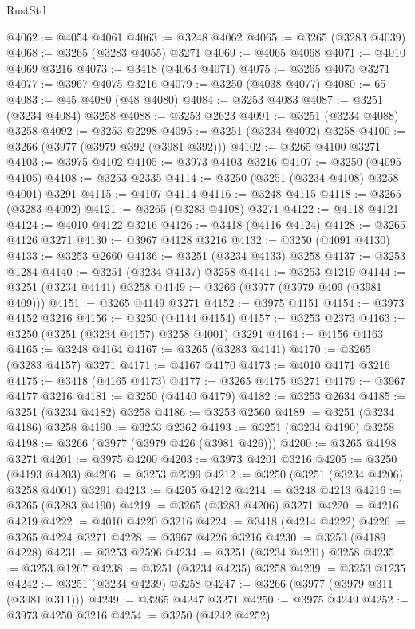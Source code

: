 \begin{lexlean}{RustStd}
\begin{coremodule}
@4062 := @4054 @4061
@4063 := @3248 @4062
@4065 := @3265 (@3283 @4039)
@4068 := @3265 (@3283 @4055) @3271
@4069 := @4065 @4068
@4071 := @4010 @4069 @3216
@4073 := @3418 (@4063 @4071)
@4075 := @3265 @4073 @3271
@4077 := @3967 @4075 @3216
@4079 := @3250 (@4038 @4077)
@4080 := 65
@4083 := @45 @4080 (@48 @4080)
@4084 := @3253 @4083
@4087 := @3251 (@3234 @4084) @3258
@4088 := @3253 @2623
@4091 := @3251 (@3234 @4088) @3258
@4092 := @3253 @2298
@4095 := @3251 (@3234 @4092) @3258
@4100 := @3266 (@3977 (@3979 @392 (@3981 @392)))
@4102 := @3265 @4100 @3271
@4103 := @3975 @4102
@4105 := @3973 @4103 @3216
@4107 := @3250 (@4095 @4105)
@4108 := @3253 @2335
@4114 := @3250 (@3251 (@3234 @4108) @3258 @4001) @3291
@4115 := @4107 @4114
@4116 := @3248 @4115
@4118 := @3265 (@3283 @4092)
@4121 := @3265 (@3283 @4108) @3271
@4122 := @4118 @4121
@4124 := @4010 @4122 @3216
@4126 := @3418 (@4116 @4124)
@4128 := @3265 @4126 @3271
@4130 := @3967 @4128 @3216
@4132 := @3250 (@4091 @4130)
@4133 := @3253 @2660
@4136 := @3251 (@3234 @4133) @3258
@4137 := @3253 @1284
@4140 := @3251 (@3234 @4137) @3258
@4141 := @3253 @1219
@4144 := @3251 (@3234 @4141) @3258
@4149 := @3266 (@3977 (@3979 @409 (@3981 @409)))
@4151 := @3265 @4149 @3271
@4152 := @3975 @4151
@4154 := @3973 @4152 @3216
@4156 := @3250 (@4144 @4154)
@4157 := @3253 @2373
@4163 := @3250 (@3251 (@3234 @4157) @3258 @4001) @3291
@4164 := @4156 @4163
@4165 := @3248 @4164
@4167 := @3265 (@3283 @4141)
@4170 := @3265 (@3283 @4157) @3271
@4171 := @4167 @4170
@4173 := @4010 @4171 @3216
@4175 := @3418 (@4165 @4173)
@4177 := @3265 @4175 @3271
@4179 := @3967 @4177 @3216
@4181 := @3250 (@4140 @4179)
@4182 := @3253 @2634
@4185 := @3251 (@3234 @4182) @3258
@4186 := @3253 @2560
@4189 := @3251 (@3234 @4186) @3258
@4190 := @3253 @2362
@4193 := @3251 (@3234 @4190) @3258
@4198 := @3266 (@3977 (@3979 @426 (@3981 @426)))
@4200 := @3265 @4198 @3271
@4201 := @3975 @4200
@4203 := @3973 @4201 @3216
@4205 := @3250 (@4193 @4203)
@4206 := @3253 @2399
@4212 := @3250 (@3251 (@3234 @4206) @3258 @4001) @3291
@4213 := @4205 @4212
@4214 := @3248 @4213
@4216 := @3265 (@3283 @4190)
@4219 := @3265 (@3283 @4206) @3271
@4220 := @4216 @4219
@4222 := @4010 @4220 @3216
@4224 := @3418 (@4214 @4222)
@4226 := @3265 @4224 @3271
@4228 := @3967 @4226 @3216
@4230 := @3250 (@4189 @4228)
@4231 := @3253 @2596
@4234 := @3251 (@3234 @4231) @3258
@4235 := @3253 @1267
@4238 := @3251 (@3234 @4235) @3258
@4239 := @3253 @1235
@4242 := @3251 (@3234 @4239) @3258
@4247 := @3266 (@3977 (@3979 @311 (@3981 @311)))
@4249 := @3265 @4247 @3271
@4250 := @3975 @4249
@4252 := @3973 @4250 @3216
@4254 := @3250 (@4242 @4252)

\end{coremodule}
\end{lexlean}
